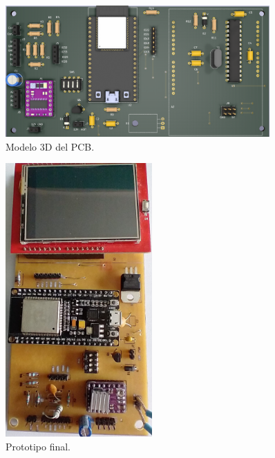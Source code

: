 \begin{figure}[htbp]
	\centering
	\includegraphics[width=0.9\textwidth]{./Figures/pcb3D.png}
	\caption{Modelo 3D del PCB.}
	\label{fig:pcb3D}
\end{figure}

\begin{figure}[htbp]
	\centering
	\includegraphics[width=0.5\textwidth]{./Figures/pcbPrototipo.jpeg}
	\caption{Prototipo final.}
	\label{fig:pcbPrototipo}
\end{figure}

